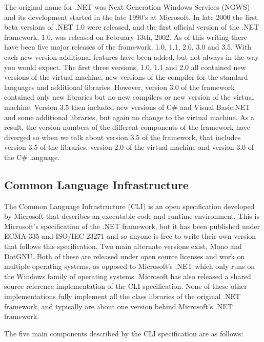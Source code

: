 	The original name for .NET was Next Generation Windows Services (NGWS) and its
	development started in the late 1990's at Microsoft. In late 2000 the first 
	beta versions of .NET 1.0 were released, and the first official version of the
	.NET framework, 1.0, was released on February 13th, 2002. As of this writing 
	there have been five major releases of the framework, 1.0, 1.1, 2.0, 3.0 and 
	3.5. With each new version additional features have been added, but not always 
	in the way you would expect. The first three versions, 1.0, 1.1 and 2.0 all 
	contained new versions of the virtual machine, new versions of the compiler 
	for the standard languages and additional libraries. However, version 3.0 of 
	the framework contained only new libraries but no new compilers or new version 
	of the virtual machine. Version 3.5 then included new versions of C\# and 
	Visual Basic.NET and some additional libraries, but again no change to the 
	virtual machine. As a result, the version numbers of the different components 
	of the framework have diverged so when we talk about version 3.5 of the 
	framework, that includes version 3.5 of the libraries, version 2.0 of the 
	virtual machine and version 3.0 of the C\# language. 

\subsection{Common Language Infrastructure}

	The Common Language Infrastructure (CLI) is an open specification developed by
	Microsoft that describes an executable code and runtime environment. This is 
	Microsoft's specification of the .NET framework, but it has been published 
	under ECMA-335 and ISO/IEC 23271 and so anyone is free to write their own 
	version that follows this specification. Two main alternate versions exist, 
	Mono and DotGNU. Both of these are released under open source licenses and 
	work on multiple operating systems, as opposed to Microsoft's .NET which only 
	runs on the Windows family of operating systems. Microsoft has also released a 
	shared source reference implementation of the CLI specification. None of these 
	other implementations fully implement all the class libraries of the original 
	.NET framework, and typically are about one version behind Microsoft's .NET 
	framework.

	The five main components described by the CLI specification are as follows:


